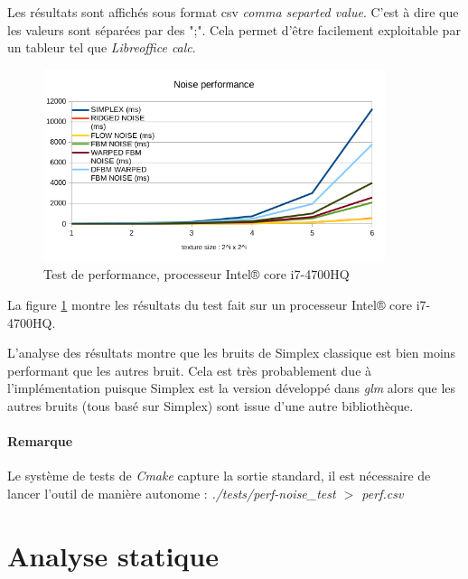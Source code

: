 Les résultats sont affichés sous format csv \textit{comma separted value}. C'est à dire que les valeurs sont séparées par des ";". Cela permet d'être facilement exploitable par un tableur tel que \textit{Libreoffice calc}.


\begin{figure}
    \centering
    \includegraphics[width=10cm]{img/noise-perf_i7-4700HQ.png}
    \caption{Test de performance, processeur Intel® core i7-4700HQ}
    \label{fig:bench}
\end{figure}

La figure \ref{fig:bench} montre les résultats du test fait sur un processeur Intel® core i7-4700HQ.

L'analyse des résultats montre que les bruits de Simplex classique est bien moins performant que les autres bruit. Cela est très probablement due à l'implémentation puisque Simplex est la version développé dans \textit{glm} alors que les autres bruits (tous basé sur Simplex) sont issue d'une autre bibliothèque. \\

\paragraph{Remarque}

Le système de tests de \textit{Cmake} capture la sortie standard, il est nécessaire de lancer l'outil de manière autonome : \textit{./tests/perf-noise_test $>$ perf.csv}\\


\newpage
\section{Analyse statique}\label{sec:sanal}

